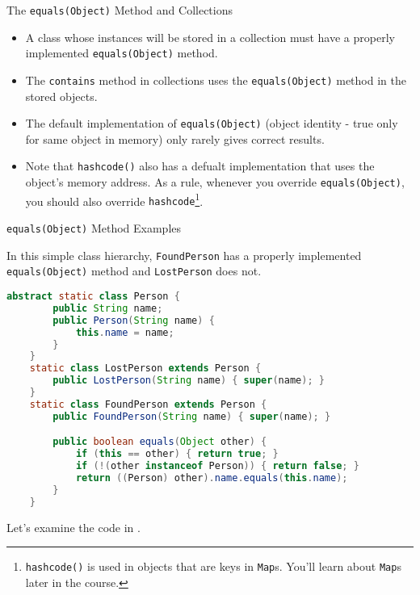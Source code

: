 \documentclass{beamer}
\begin{document}
\begin{frame}[fragile]{The {\tt equals(Object)} Method and Collections}



\begin{itemize}
\item A class whose instances will be stored in a collection must have a properly implemented {\tt equals(Object)} method.
\item The {\tt contains} method in collections uses the {\tt equals(Object)} method in the stored objects.
\item The default implementation of {\tt equals(Object)} (object identity - true only for same object in memory) only rarely gives correct results.
\item Note that {\tt hashcode()} also has a defualt implementation that uses the object's memory address.  As a rule, whenever you override {\tt equals(Object)}, you should also override {\tt hashcode}\footnote{{\tt hashcode()} is used in objects that are keys in {\tt Map}s.  You'll learn about {\tt Map}s later in the course.}.
\end{itemize}


\end{frame}

\begin{frame}[fragile]{{\tt equals(Object)} Method Examples}

\vspace{-.05in}
In this simple class hierarchy, {\tt FoundPerson} has a properly implemented {\tt equals(Object)} method and {\tt LostPerson} does not.
\vspace{-.05in}
\begin{lstlisting}[language=Java]
    abstract static class Person {
        public String name;
        public Person(String name) {
            this.name = name;
        }
    }
    static class LostPerson extends Person {
        public LostPerson(String name) { super(name); }
    }
    static class FoundPerson extends Person {
        public FoundPerson(String name) { super(name); }

        public boolean equals(Object other) {
            if (this == other) { return true; }
            if (!(other instanceof Person)) { return false; }
            return ((Person) other).name.equals(this.name);
        }
    }
\end{lstlisting}
\vspace{-.05in}
Let's examine the code in .

\end{frame}
\end{document}
